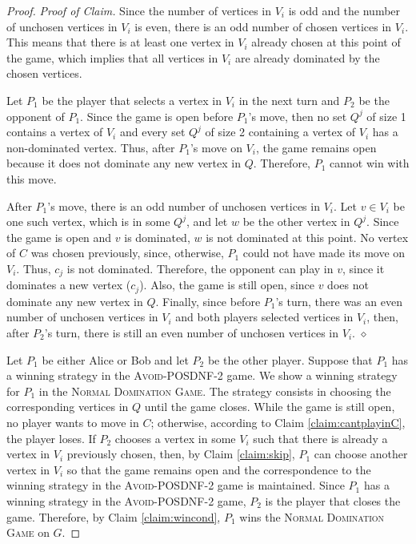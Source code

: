 \documentclass[12pt]{article}
\newcommand{\qedclaim}{\hfill $\diamond$ \medskip}
\newenvironment{proofclaim}{\noindent\emph{Proof of Claim.}}{\qedclaim}
\begin{document}
\begin{proof}
\begin{proofclaim}
Since the number of vertices in $V_i$ is odd and the number of unchosen vertices in $V_i$ is even, there is an odd number of chosen vertices in $V_i$. This means that there is at least one vertex in $V_i$ already chosen at this point of the game, which implies that all vertices in $V_i$ are already dominated by the chosen vertices.

Let $P_1$ be the player that selects a vertex in $V_i$ in the next turn and $P_2$ be the opponent of $P_1$. Since the game is open before $P_1$'s move, then no set $Q^j$ of size 1 contains a vertex of $V_i$ and every set $Q^j$ of size 2 containing a vertex of $V_i$ has a non-dominated vertex.
Thus, after $P_1$'s move on $V_i$, the game remains open because it does not dominate any new vertex in $Q$. Therefore, $P_1$ cannot win with this move.

After $P_1$'s move, there is an odd number of unchosen vertices in $V_i$. Let $v\in V_i$ be one such vertex, which is in some $Q^j$, and let $w$ be the other vertex in $Q^j$. Since the game is open and $v$ is dominated, $w$ is not dominated at this point. No vertex of $C$ was chosen previously, since, otherwise, $P_1$ could not have made its move on $V_i$. Thus, $c_j$ is not dominated. Therefore, the opponent can play in $v$, since it dominates a new vertex ($c_j$). Also, the game is still open, since $v$ does not dominate any new vertex in $Q$. Finally, since before $P_1$'s turn, there was an even number of unchosen vertices in $V_i$ and both players selected vertices in $V_i$, then, after $P_2$'s turn, there is still an even number of unchosen vertices in $V_i$.
\end{proofclaim}

\medskip

Let $P_1$ be either Alice or Bob and let $P_2$ be the other player. Suppose that $P_1$ has a winning strategy in the \textsc{Avoid-POSDNF-2} game. We show a winning strategy for $P_1$ in the \textsc{Normal Domination Game}. The strategy consists in choosing the corresponding vertices in $Q$ until the game closes. While the game is still open, no player wants to move in $C$; otherwise, according to Claim \ref{claim:cantplayinC}, the player loses. If $P_2$ chooses a vertex in some $V_i$ such that there is already a vertex in $V_i$ previously chosen, then, by Claim \ref{claim:skip}, $P_1$ can choose another vertex in $V_i$ so that the game remains open and the correspondence to the winning strategy in the \textsc{Avoid-POSDNF-2} game is maintained. Since $P_1$ has a winning strategy in the \textsc{Avoid-POSDNF-2} game, $P_2$ is the player that closes the game. Therefore, by Claim \ref{claim:wincond}, $P_1$ wins the \textsc{Normal Domination Game} on $G$.
\end{proof}
\end{document}
